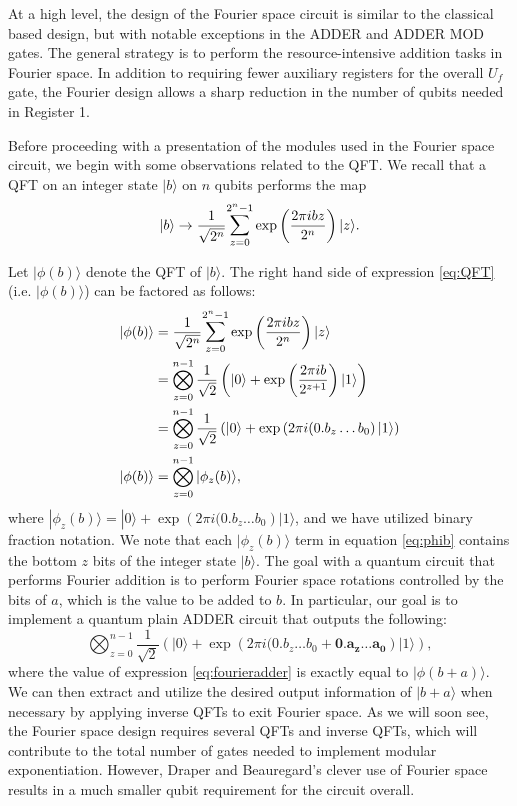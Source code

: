 \documentclass{article}
\begin{document}
At a high level, the design of the Fourier space circuit is similar to the classical based design, but with notable exceptions in the ADDER and ADDER MOD gates. The general strategy is to perform the resource-intensive addition tasks in Fourier space. In addition to requiring fewer auxiliary registers for the overall $U_f$ gate, the Fourier design allows a sharp reduction in the number of qubits needed in Register 1.

Before proceeding with a presentation of the modules used in the Fourier space circuit, we begin with some observations related to the QFT. We recall that a QFT on an integer state $|b\rangle$ on $n$ qubits performs the map
\begin{equation}
\label{eq:QFT}
|b\rangle \to \dfrac{1}{\sqrt{2^n}}  \mathlarger \sum_{z=0}^{2^n-1}\exp\left(\dfrac{2\pi i b z}{2^n}\right)|z\rangle.
\end{equation}

Let $|\phi(b)\rangle$ denote the QFT of $|b\rangle$. The right hand side of expression \eqref{eq:QFT} (i.e. $|\phi(b)\rangle$) can be factored as follows:
\begin{align}
|\phi(b)\rangle &= \dfrac{1}{\sqrt{2^n}} \mathlarger \sum_{z=0}^{2^n-1}\exp\left(\dfrac{2\pi i b z}{2^n}\right)|z\rangle \nonumber \\
&= \bigotimes_{z=0}^{n-1} \dfrac{1}{\sqrt{2}}\left(|0\rangle + \exp\left(\dfrac{2 \pi i b}{2^{z+1}} \right)|1\rangle\right) \nonumber \\
\label{eq:phib}
&= \bigotimes_{z=0}^{n-1} \dfrac{1}{\sqrt{2}}\left(|0\rangle + \exp\left(2\pi i (0.b_z\ldots b_0 \right)|1\rangle\right) \\
|\phi(b)\rangle &= \bigotimes_{z=0}^{n-1} |\phi_z(b)\rangle, \nonumber
\end{align} 
where $|\phi_z(b)\rangle = |0\rangle + \exp\left(2\pi i (0.b_z\ldots b_0 \right)|1\rangle$, and we have utilized binary fraction notation. We note that each $|\phi_z(b)\rangle$ term in equation \eqref{eq:phib} contains the bottom $z$ bits of the integer state $|b\rangle$. The goal with a quantum circuit that performs Fourier addition is to perform Fourier space rotations controlled by the bits of $a$, which is the value to be added to $b$. In particular, our goal is to implement a quantum plain ADDER circuit that outputs the following: 
\begin{equation}
\label{eq:fourieradder}
\bigotimes_{z=0}^{n-1} \dfrac{1}{\sqrt{2}}\left(|0\rangle + \exp\left(2\pi i (0.b_z\ldots b_0 + \mathbf{0.a_z \ldots a_0}\right)|1\rangle\right), 	
\end{equation}
where the value of expression \eqref{eq:fourieradder} is exactly equal to $|\phi(b+a)\rangle$. We can then extract and utilize the desired output information of $|b+a\rangle$ when necessary by applying inverse QFTs to exit Fourier space. As we will soon see, the Fourier space design requires several QFTs and inverse QFTs, which will contribute to the total number of gates needed to implement modular exponentiation. However, Draper and Beauregard's clever use of Fourier space results in a much smaller qubit requirement for the circuit overall. 
\end{document}
